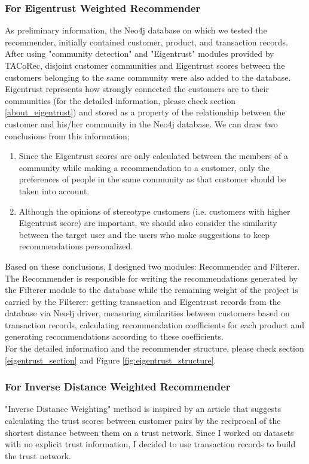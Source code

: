 \subsubsection{For Eigentrust Weighted Recommender}
As preliminary information, the Neo4j database on which we tested the recommender, initially contained customer, product, and transaction records. After using "community detection" and "Eigentrust" modules provided by TACoRec, disjoint customer communities and Eigentrust scores between the customers belonging to the same community were also added to the database.\\

Eigentrust represents how strongly connected the customers are to their communities (for the detailed information, please check section \ref{about_eigentrust}) and stored as a property of the relationship between the customer and his/her community in the Neo4j database. We can draw two conclusions from this information;
\begin{enumerate}
	\item Since the Eigentrust scores are only calculated between the members of a community while making a recommendation to a customer, only the preferences of people in the same community as that customer should be taken into account.
	\item Although the opinions of stereotype customers (i.e. customers with higher Eigentrust score) are important, we should also consider the similarity between the target user and the users who make suggestions to keep recommendations personalized.
\end{enumerate}
Based on these conclusions, I designed two modules: Recommender and Filterer. The Recommender is responsible for writing the recommendations generated by the Filterer module to the database while the remaining weight of the project is carried by the Filterer: getting transaction and Eigentrust records from the database via Neo4j driver, measuring similarities between customers based on transaction records, calculating recommendation coefficients for each product and generating recommendations according to these coefficients. \\

For the detailed information and the recommender structure, please check section \ref{eigentrust_section} and Figure \ref{fig:eigentrust_structure}.
\subsubsection{For Inverse Distance Weighted Recommender}
"Inverse Distance Weighting" method is inspired by an article\cite{inverse_article} that suggests calculating the trust scores between customer pairs by the reciprocal of the shortest distance between them on a trust network. Since I worked on datasets with no explicit trust information, I decided to use transaction records to build the trust network. \\

